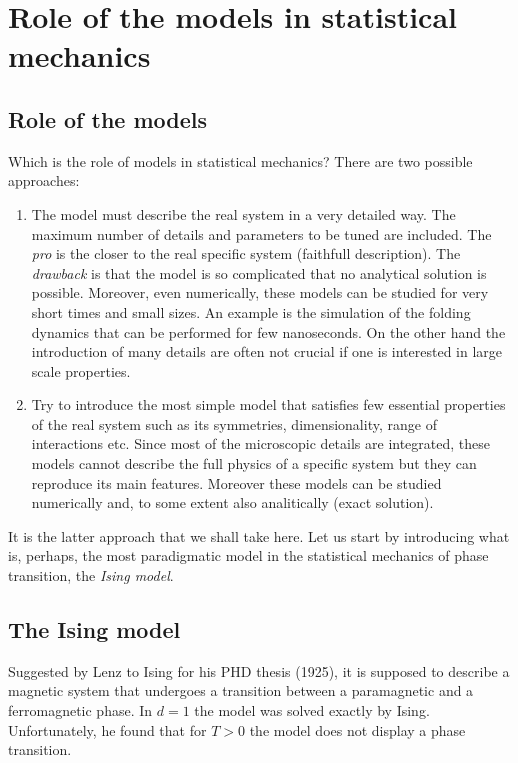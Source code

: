 \documentclass[../main/main.tex]{subfiles}
\begin{document}
\chapter{Role of the models in statistical mechanics}
\section{Role of the models}
Which is the role of models in statistical mechanics? There are two possible approaches:
\begin{enumerate}
  \item The model must describe the real system in a very detailed way. The maximum number of details and parameters to be tuned are included. The \emph{pro} is the closer to the real specific system (faithfull description). The \emph{drawback} is that the model is so complicated that no analytical solution is possible. Moreover, even numerically, these models can be studied for very short times and small sizes.
  An example is the simulation of the folding dynamics that can be performed for few nanoseconds. On the other hand the introduction of many details are often not crucial if one is interested in large scale properties.
  \item Try to introduce the most simple model that satisfies few essential properties of the real system such as its symmetries, dimensionality, range of interactions etc.
  Since most of the microscopic details are integrated, these models cannot describe the full physics of a specific system but they can reproduce its main features. Moreover these models can be studied numerically and, to some extent also analitically (exact solution).
\end{enumerate}

It is the latter approach that we shall take here.
  Let us start by introducing what is, perhaps, the most paradigmatic model in the statistical mechanics of phase transition, the \emph{Ising model}.

  \section{The Ising model}
  Suggested by Lenz to Ising for his PHD thesis (1925), it is supposed to describe a magnetic system that undergoes a transition between a paramagnetic and a ferromagnetic phase.
  In \( d=1 \) the model was solved exactly by Ising. Unfortunately, he found that for \( T>0 \) the model does not display a phase transition.
\end{document}
